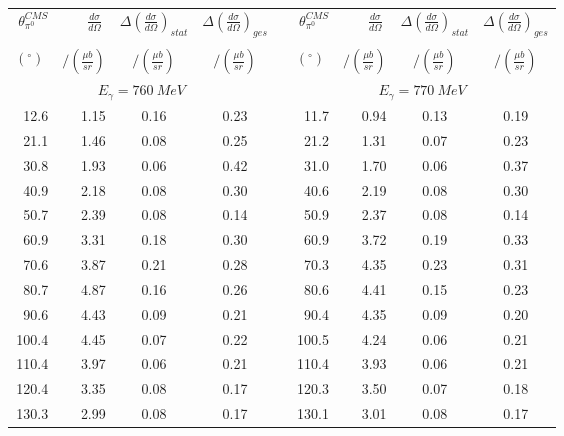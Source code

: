 \begin{table}[htbp] 
\begin{center} 
\begin{tabular}{|r|r|c|c|l|r|r|c|c|} 

\cline{1-4}
\cline{6-9} 
$\theta_{\pi^0}^{CMS}$ & 
$\displaystyle\frac{d\sigma}{d\Omega}\;$ & 
${\Delta}\left( \frac{d\sigma}{d\Omega}\right)_{stat}$ & 
${\Delta}\left( \frac{d\sigma}{d\Omega}\right)_{ges}$ & & 
$\theta_{\pi^0}^{CMS}$ & 
$\displaystyle\frac{d\sigma}{d\Omega}\;$ & 
${\Delta}\left( \frac{d\sigma}{d\Omega}\right)_{stat}$ & 
${\Delta}\left( \frac{d\sigma}{d\Omega}\right)_{ges}$ \\ 
& & & & & & & &\\ 
 $(^{\circ})\;$ & $/(\frac{{\mu}b}{sr})$ & $/(\frac{{\mu}b}{sr})$ & $/(\frac{{\mu}b}{sr})$ & & $(^{\circ})\;$ & $/(\frac{{\mu}b}{sr})$ & $/(\frac{{\mu}b}{sr})$ & $/(\frac{{\mu}b}{sr})$ \\ 
\cline{1-4} 
\cline{6-9} 
\multicolumn{4}{|c|}{ $E_{\gamma}=760~MeV$} & & 
\multicolumn{4}{c|}{ $E_{\gamma}=770~MeV$} \\ 
\cline{1-4} 
\cline{6-9} 
 12.6 &  1.15 &  0.16 &  0.23 & &  11.7 &  0.94 &  0.13 &  0.19 \\ 
 21.1 &  1.46 &  0.08 &  0.25 & &  21.2 &  1.31 &  0.07 &  0.23 \\ 
 30.8 &  1.93 &  0.06 &  0.42 & &  31.0 &  1.70 &  0.06 &  0.37 \\ 
 40.9 &  2.18 &  0.08 &  0.30 & &  40.6 &  2.19 &  0.08 &  0.30 \\ 
 50.7 &  2.39 &  0.08 &  0.14 & &  50.9 &  2.37 &  0.08 &  0.14 \\ 
 60.9 &  3.31 &  0.18 &  0.30 & &  60.9 &  3.72 &  0.19 &  0.33 \\ 
 70.6 &  3.87 &  0.21 &  0.28 & &  70.3 &  4.35 &  0.23 &  0.31 \\ 
 80.7 &  4.87 &  0.16 &  0.26 & &  80.6 &  4.41 &  0.15 &  0.23 \\ 
 90.6 &  4.43 &  0.09 &  0.21 & &  90.4 &  4.35 &  0.09 &  0.20 \\ 
100.4 &  4.45 &  0.07 &  0.22 & & 100.5 &  4.24 &  0.06 &  0.21 \\ 
110.4 &  3.97 &  0.06 &  0.21 & & 110.4 &  3.93 &  0.06 &  0.21 \\ 
120.4 &  3.35 &  0.08 &  0.17 & & 120.3 &  3.50 &  0.07 &  0.18 \\ 
130.3 &  2.99 &  0.08 &  0.17 & & 130.1 &  3.01 &  0.08 &  0.17 \\ 

\end{tabular}
\end{center}
\end{table}
